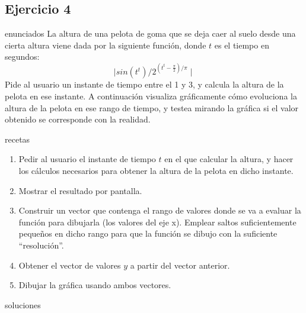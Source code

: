 \subsection{Ejercicio 4}
\def\parte{enunciados}
\ifx\capitulo\parte
La altura de una pelota de goma que se deja caer al suelo desde una cierta altura viene dada por la siguiente función, donde $t$ es el tiempo en segundos:
\[\mid sin(t^t) / 2^{(t^t - \frac{\pi}{2})/\pi} \mid\]
Pide al usuario un instante de tiempo entre el 1 y 3, y calcula la altura de la pelota en ese instante. A continuación visualiza gráficamente cómo evoluciona la altura de la pelota en ese rango de tiempo, y testea  mirando la gráfica si el valor obtenido se corresponde con la realidad.
\fi

\def\parte{recetas}
\ifx\capitulo\parte
\begin{enumerate}
\item Pedir al usuario el instante de tiempo $t$ en el que calcular la altura, y hacer los cálculos necesarios para obtener la altura de la pelota en dicho instante.
\item Mostrar el resultado por pantalla.
\item Construir un vector que contenga el rango de valores donde se va a evaluar la función para dibujarla (los valores del eje x). Emplear saltos suficientemente pequeños en dicho rango para que la función se dibujo con la suficiente ``resolución''.
\item Obtener el vector de valores $y$ a partir del vector anterior.
\item Dibujar la gráfica usando ambos vectores.
\end{enumerate}
\fi

\def\parte{soluciones}
\ifx\capitulo\parte

\fi
